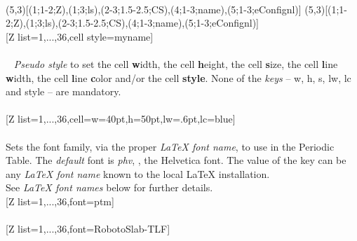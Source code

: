 \\ [5pt](5,3)[(1;1-2;Z),(1;3;ls),(2-3;1.5-2.5;CS),(4;1-3;name),(5;1-3;eConfignl)]%
(5,3)[(1;1-2;Z),(1;3;ls),(2-3;1.5-2.5;CS),(4;1-3;name),(5;1-3;eConfignl)]%
\\ [-4pt][Z list={1,...,36},cell style=myname]%
\\ [10pt]\makebox[\linewidth][c]{\scalebox{.6}{\pgfPT[Z list={1,...,36},cell style=myname]}}%
\\ [5pt]\pgfPTendoption%
\newpage\vspace{-34pt}\ %
\label{style_cell}%
%
{\textit{Pseudo style} to set the cell \textbf{w}idth, the cell \textbf{h}eight, the cell \textbf{s}ize, the cell \textbf{l}ine \textbf{w}idth, the cell \textbf{l}ine \textbf{c}olor and/or the cell \textbf{style}. None of the \textit{keys} -- w, h, s, lw, lc and style -- are mandatory.
\\ [3pt]%
}%
\\ [5pt][Z list={1,...,36},cell={w=40pt,h=50pt,lw=.6pt,lc=blue}]%
\\ [10pt]\makebox[\linewidth][c]{\scalebox{.6}{\pgfPT[Z list={1,...,36},cell={w=40pt,h=50pt,lw=.6pt,lc=blue}]}}%
\\ [5pt]\pgfPTendstyle%
\label{option_font}%
%
{Sets the font family, via the proper \textit{\textrm{\LaTeX} font name}, to use in the Periodic Table. The \textit{default} font is \textit{phv}, \ie, the Helvetica font.
The value of the  key can be any \textit{\textrm{\LaTeX} font name} known to the local \textrm{\LaTeX} installation.
\\ \hfill\scriptsize See \textit{\textrm{\LaTeX} font names} below for further details.}%
\\ [5pt][Z list={1,...,36},font=ptm]%
\\ [10pt]\makebox[\linewidth][c]{\scalebox{.6}{\pgfPT[Z list={1,...,36},font=ptm]}}%
\\ [10pt][Z list={1,...,36},font=RobotoSlab-TLF]%
\\ [10pt]\makebox[\linewidth][c]{\scalebox{.6}{\pgfPT[Z list={1,...,36},font=RobotoSlab-TLF]}}%
